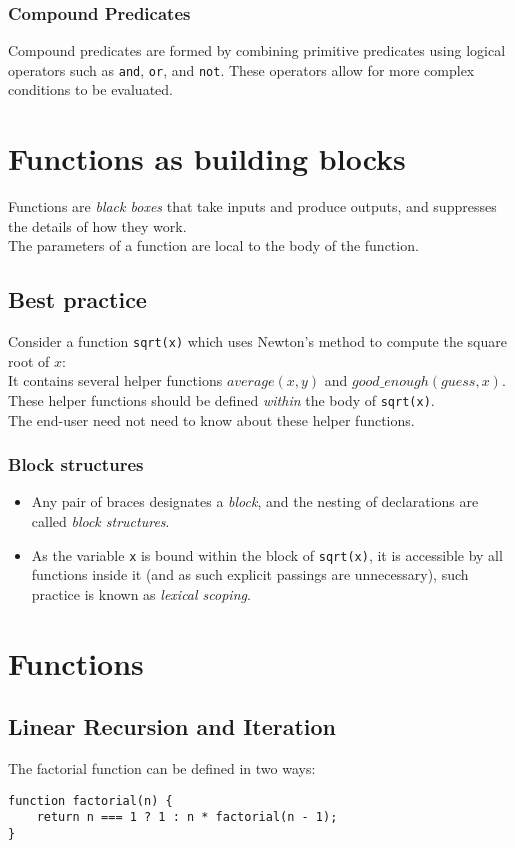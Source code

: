\documentclass{notes}
\begin{document}
\subsubsection{Compound Predicates}
Compound predicates are formed by combining primitive predicates using logical operators such as \texttt{and}, \texttt{or}, and \texttt{not}. These operators allow for more complex conditions to be evaluated.

\section{Functions as building blocks}
Functions are \emph{black boxes} that take inputs and produce outputs, and suppresses the details of how they work. \\
The parameters of a function are local to the body of the function.

\subsection{Best practice}
Consider a function \texttt{sqrt(x)} which uses Newton's method to compute the square root of \(x\):\\
It contains several helper functions \texttt{\(average(x, y)\)} and \texttt{\(good\_enough(guess, x)\)}.
These helper functions should be defined \emph{within} the body of \texttt{sqrt(x)}.\\
The end-user need not need to know about these helper functions. 

\subsubsection{Block structures}
\begin{itemize}
    \item Any pair of braces designates a \emph{block}, and the nesting of declarations are called \emph{block structures}. 
    \item As the variable \texttt{x} is bound within the block of \texttt{sqrt(x)}, it is accessible by all functions inside it (and as such explicit passings are unnecessary), such practice is known as \textit{lexical scoping}.\\
\end{itemize}

\section{Functions}
\subsection{Linear Recursion and Iteration}
The factorial function can be defined in two ways:
\begin{verbatim}
function factorial(n) {
    return n === 1 ? 1 : n * factorial(n - 1);
}
\end{verbatim}
\end{document}
